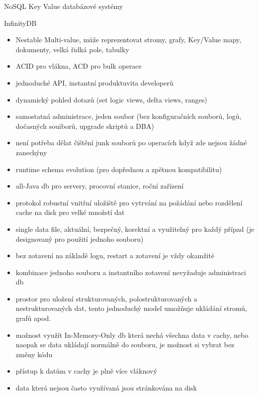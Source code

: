 \documentclass{article}
\begin{document}
\begin{section}{NoSQL Key Value databázové systémy}
		\begin{subsection}{InfinityDB}
			\begin{itemize}
				\item Nestable Multi-value, může reprezentovat stromy, grafy, Key/Value mapy, dokumenty, velká řidká pole, tabulky
				\item ACID pro vlákna, ACD pro bulk operace
				\item jednoduché API, instantní produktuvita developerů
				\item dynamický pohled dotazů (set logic views, delta views, ranges)
				\item samostatná administrace, jeden soubor (bez konfiguračních souborů, logů, dočasných souiborů, upgrade skriptů a DBA)
				\item není potřeba dělat čištění junk souborů po operacích když zde nejsou žádné zanechýny
				\item runtime schema evolution (pro dopřednou a zpětnou kompatibilitu)
				\item all-Java db pro servery, procovní stanice, roční zařízení
				\item protokol robustní vnitřní uložiště pro vytrvání na požádání nebo rozdělení cache na disk pro velké množstí dat
				\item single data file, aktuální, bezpečný, korektní a využitelný pro každý případ (je designovaný pro použití jednoho souboru)
				\item bez zotavení na základě logu, restart a zotavení je vždy okamžité
				\item kombinace jednoho souboru a instantního zotavení nevyžaduje administraci db
				\item prostor pro uložení strukturovaných, polostrukturovaných a nestrukturovaných dat, tento jednoduchý model umožňuje ukládání stromů, grafů apod.
				\item možnost využít In-Memory-Only db která nechá všechna data v cachy, nebo naopak se data ukládají normálně do souboru, je možnost si vybrat bez změny kódu
				\item přístup k datům v cachy je plně více vláknový
				\item data která nejsou často využívaná jsou stránkována na disk
			\end{itemize}
		\end{subsection}
		

\end{section}
\end{document}
